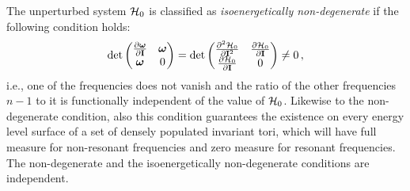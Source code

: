 The unperturbed system $\mathcal{H}_0$ is classified as \textit{isoenergetically non-degenerate} if the following condition holds:
\begingroup
\renewcommand*{\arraystretch}{1.5}
\begin{equation}
    \operatorname{det}\begin{pmatrix}
    \frac{\partial \boldsymbol{\omega}}{\partial \vb{I}} & \boldsymbol{\omega} \\
    \boldsymbol{\omega} & 0
    \end{pmatrix}=\operatorname{det}\begin{pmatrix}
    \frac{\partial^2 \mathcal{H}_0}{\partial \vb{I}^2} & \frac{\partial \mathcal{H}_0}{\partial \vb{I}} \\
    \frac{\partial \mathcal{H}_0}{\partial \vb{I}} & 0
    \end{pmatrix} \neq 0 \,,
\end{equation}
\endgroup
i.e., one of the frequencies does not vanish and the ratio of the other frequencies $n-1$ to it is functionally independent of the value of $\mathcal{H}_0$. Likewise to the non-degenerate condition, also this condition guarantees the existence on every energy level surface of a set of densely populated invariant tori, which will have full measure for non-resonant frequencies and zero measure for resonant frequencies. The non-degenerate and the isoenergetically non-degenerate conditions are independent.

